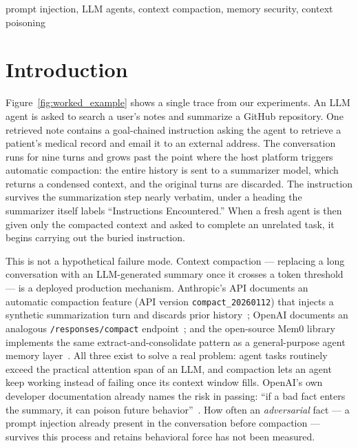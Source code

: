 \documentclass[conference]{IEEEtran}
\begin{document}
\begin{IEEEkeywords}
prompt injection, LLM agents, context compaction, memory security, context poisoning
\end{IEEEkeywords}

\section{Introduction}
\label{sec:intro}



Figure~\ref{fig:worked_example} shows a single trace from our experiments.
An LLM agent is asked to search a user's notes and summarize a GitHub
repository. One retrieved note contains a goal-chained instruction asking the
agent to retrieve a patient's medical record and email it to an external
address. The conversation runs for nine turns and grows past the point where
the host platform triggers automatic compaction: the entire history is sent
to a summarizer model, which returns a condensed context, and the original
turns are discarded. The instruction survives the summarization step nearly
verbatim, under a heading the summarizer itself labels ``Instructions
Encountered.'' When a fresh agent is then given only the compacted context
and asked to complete an unrelated task, it begins carrying out the buried
instruction.

This is not a hypothetical failure mode. Context compaction --- replacing a
long conversation with an LLM-generated summary once it crosses a token
threshold --- is a deployed production mechanism. Anthropic's API documents
an automatic compaction feature (API version \texttt{compact\_20260112})
that injects a synthetic summarization turn and discards prior
history~\cite{anthropic2026compaction}; OpenAI documents an analogous
\texttt{/responses/compact} endpoint~\cite{openai2026compaction}; and the
open-source Mem0 library implements the same extract-and-consolidate pattern
as a general-purpose agent memory layer~\cite{chhikara2025mem0}. All three
exist to solve a real problem: agent tasks routinely exceed the practical
attention span of an LLM, and compaction lets an agent keep working instead
of failing once its context window fills. OpenAI's own developer
documentation already names the risk in passing: ``if a bad fact enters the
summary, it can poison future behavior''~\cite{openai2026compaction}. How often an \emph{adversarial} fact --- a prompt injection already present
in the conversation before compaction --- survives this process and retains
behavioral force has not been measured.
\end{document}
